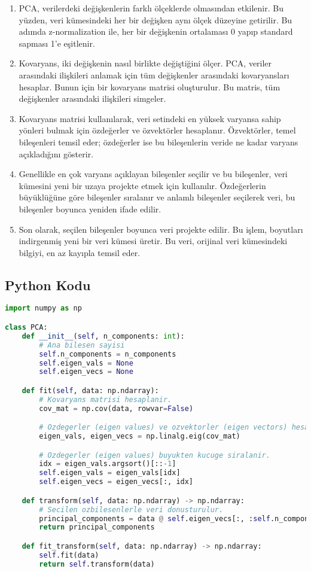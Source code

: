 \begin{enumerate}
    \item PCA, verilerdeki değişkenlerin farklı ölçeklerde olmasından etkilenir. Bu yüzden, veri kümesindeki her bir değişken aynı ölçek düzeyine getirilir. Bu adımda z-normalization ile, her bir değişkenin ortalaması 0 yapıp standard sapması 1'e eşitlenir.
    \item Kovaryans, iki değişkenin nasıl birlikte değiştiğini ölçer. PCA, veriler arasındaki ilişkileri anlamak için tüm değişkenler arasındaki kovaryansları hesaplar. Bunun için bir kovaryans matrisi oluşturulur. Bu matris, tüm değişkenler arasındaki ilişkileri simgeler.
    \item Kovaryans matrisi kullanılarak, veri setindeki en yüksek varyansa sahip yönleri bulmak için özdeğerler ve özvektörler hesaplanır. Özvektörler, temel bileşenleri temsil eder; özdeğerler ise bu bileşenlerin veride ne kadar varyans açıkladığını gösterir.
    \item Genellikle en çok varyans açıklayan bileşenler seçilir ve bu bileşenler, veri kümesini yeni bir uzaya projekte etmek için kullanılır. Özdeğerlerin büyüklüğüne göre bileşenler sıralanır ve anlamlı bileşenler seçilerek veri, bu bileşenler boyunca yeniden ifade edilir.
    \item Son olarak, seçilen bileşenler boyunca veri projekte edilir. Bu işlem, boyutları indirgenmiş yeni bir veri kümesi üretir. Bu veri, orijinal veri kümesindeki bilgiyi, en az kayıpla temsil eder.
\end{enumerate}

\subsection{Python Kodu}

\begin{lstlisting}[language=Python]
import numpy as np

class PCA:
    def __init__(self, n_components: int):
        # Ana bilesen sayisi
        self.n_components = n_components
        self.eigen_vals = None
        self.eigen_vecs = None

    def fit(self, data: np.ndarray):
        # Kovaryans matrisi hesaplanir.
        cov_mat = np.cov(data, rowvar=False)

        # Ozdegerler (eigen values) ve ozvektorler (eigen vectors) hesaplanir.
        eigen_vals, eigen_vecs = np.linalg.eig(cov_mat)

        # Ozdegerler (eigen values) buyukten kucuge siralanir.
        idx = eigen_vals.argsort()[::-1]
        self.eigen_vals = eigen_vals[idx]
        self.eigen_vecs = eigen_vecs[:, idx]

    def transform(self, data: np.ndarray) -> np.ndarray:
        # Secilen ozbilesenlerle veri donusturulur.
        principal_components = data @ self.eigen_vecs[:, :self.n_components]
        return principal_components

    def fit_transform(self, data: np.ndarray) -> np.ndarray:
        self.fit(data)
        return self.transform(data)
\end{lstlisting}

\newpage
